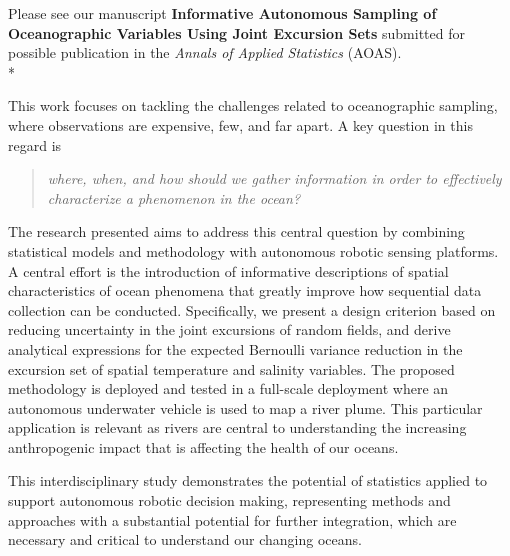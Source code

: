 \documentclass[10pt,stdletter]{newlfm}
\begin{document}
\begin{newlfm}

Please see our manuscript \textbf{Informative Autonomous Sampling of Oceanographic Variables Using Joint Excursion Sets} submitted for possible publication in the \emph{Annals of Applied Statistics} (AOAS).\\*

This work focuses on tackling the challenges related to oceanographic sampling, where observations are expensive, few, and far apart. A key question in this regard is 

\begin{quote}
\textit{where, when, and how should we gather information in order to effectively characterize a phenomenon in the ocean?}  
\end{quote}{}

The research presented aims to address this central question by combining statistical models and methodology with autonomous robotic sensing platforms. A central effort is the introduction of informative descriptions of spatial characteristics of ocean phenomena that greatly improve how sequential data collection can be conducted. Specifically, we present a design criterion based on reducing uncertainty in the joint excursions of random fields, and derive analytical expressions for the expected Bernoulli variance reduction in the excursion set of spatial temperature and salinity variables. The proposed methodology is deployed and tested in a full-scale deployment where an autonomous underwater vehicle is used to map a river plume. This particular application is relevant as rivers are central to understanding the increasing anthropogenic impact that is affecting the health of our oceans. 

This interdisciplinary study demonstrates the potential of statistics applied to support autonomous robotic decision making, representing methods and approaches with a substantial potential for further integration, which are necessary and critical to understand our changing oceans. 


\vspace{1em}


\end{newlfm}
\end{document}
